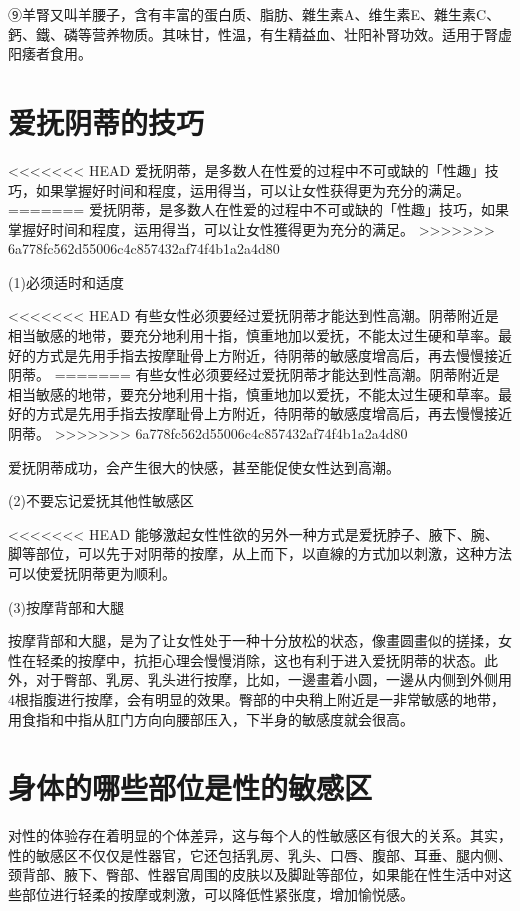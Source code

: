 \documentclass[12pt,UTF8]{ctexbook}
\begin{document}
⑨羊腎又叫羊腰子，含有丰富的蛋白质、脂肪、雜生素A、维生素E、雜生素C、鈣、鐵、磷等营养物质。其味甘，性温，有生精益血、壮阳补腎功效。适用于腎虚阳痿者食用。

\section{爱抚阴蒂的技巧}

<<<<<<< HEAD
爱抚阴蒂，是多数人在性爱的过程中不可或缺的「性趣」技巧，如果掌握好时间和程度，运用得当，可以让女性获得更为充分的满足。
=======
爱抚阴蒂，是多数人在性爱的过程中不可或缺的「性趣」技巧，如果掌握好时间和程度，运用得当，可以让女性獲得更为充分的满足。
>>>>>>> 6a778fc562d55006c4c857432af74f4b1a2a4d80

(1)必须适时和适度

<<<<<<< HEAD
有些女性必须要经过爱抚阴蒂才能达到性高潮。阴蒂附近是相当敏感的地带，要充分地利用十指，慎重地加以爱抚，不能太过生硬和草率。最好的方式是先用手指去按摩耻骨上方附近，待阴蒂的敏感度增高后，再去慢慢接近阴蒂。
=======
有些女性必须要经过爱抚阴蒂才能达到性高潮。阴蒂附近是相当敏感的地带，要充分地利用十指，慎重地加以爱抚，不能太过生硬和草率。最好的方式是先用手指去按摩耻骨上方附近，待阴蒂的敏感度增高后，再去慢慢接近阴蒂。
>>>>>>> 6a778fc562d55006c4c857432af74f4b1a2a4d80

爱抚阴蒂成功，会产生很大的快感，甚至能促使女性达到高潮。

(2)不要忘记爱抚其他性敏感区

<<<<<<< HEAD
能够激起女性性欲的另外一种方式是爱抚脖子、腋下、腕、脚等部位，可以先于对阴蒂的按摩，从上而下，以直線的方式加以刺激，这种方法可以使爱抚阴蒂更为顺利。

(3)按摩背部和大腿

按摩背部和大腿，是为了让女性处于一种十分放松的状态，像畫圆畫似的搓揉，女性在轻柔的按摩中，抗拒心理会慢慢消除，这也有利于进入爱抚阴蒂的状态。此外，对于臀部、乳房、乳头进行按摩，比如，一邊畫着小圆，一邊从内侧到外侧用4根指腹进行按摩，会有明显的效果。臀部的中央稍上附近是一非常敏感的地带，用食指和中指从肛门方向向腰部压入，下半身的敏感度就会很高。

\section{身体的哪些部位是性的敏感区}

对性的体验存在着明显的个体差异，这与每个人的性敏感区有很大的关系。其实，性的敏感区不仅仅是性器官，它还包括乳房、乳头、口唇、腹部、耳垂、腿内侧、颈背部、腋下、臀部、性器官周围的皮肤以及脚趾等部位，如果能在性生活中对这些部位进行轻柔的按摩或刺激，可以降低性紧张度，增加愉悦感。
\end{document}
